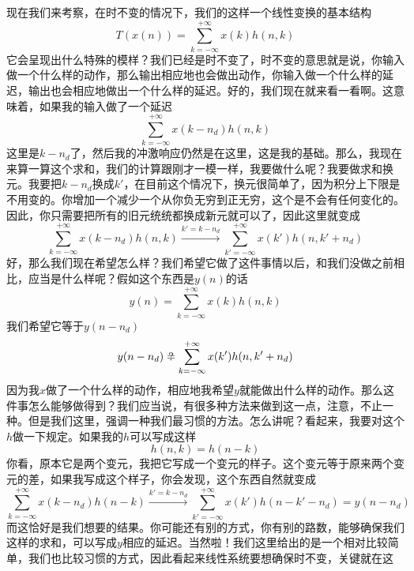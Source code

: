 \documentclass[a4paper,12pt]{article}
\begin{document}
现在我们来考察，在时不变的情况下，我们的这样一个线性变换的基本结构
\begin{equation}
   T\left ( x(n) \right ) = \sum_{k=-\infty}^{+\infty}x(k)h(n,k)
\end{equation}
它会呈现出什么特殊的模样？我们已经是时不变了，时不变的意思就是说，你输入做一个什么样的动作，那么输出相应地也会做出动作，你输入做一个什么样的延迟，输出也会相应地做出一个什么样的延迟。好的，我们现在就来看一看啊。这意味着，如果我的输入做了一个延迟
\begin{equation}
   \sum_{k=-\infty}^{+\infty}x(k-n_d)h(n,k)
\end{equation}
这里是$k-n_d$了，然后我的冲激响应仍然是在这里，这是我的基础。那么，我现在来算一算这个求和，我们的计算跟刚才一模一样，我要做什么呢？我要做求和换元。我要把$k-n_d$换成$k'$，在目前这个情况下，换元很简单了，因为积分上下限是不用变的。你增加一个减少一个从你负无穷到正无穷，这个是不会有任何变化的。因此，你只需要把所有的旧元统统都换成新元就可以了，因此这里就变成
\begin{equation}
  \sum_{k=-\infty}^{+\infty}x(k-n_d)h(n,k)  \xrightarrow{k'=k-n_d}
  \sum_{k'=-\infty}^{+\infty}x(k')h(n,k'+n_d)
\end{equation}
好，那么我们现在希望怎么样？我们希望它做了这件事情以后，和我们没做之前相比，应当是什么样呢？假如这个东西是$y(n)$的话
\begin{equation}
   y(n) = \sum_{k=-\infty}^{+\infty}x(k)h(n,k)
\end{equation}
我们希望它等于$y(n-n_d)$
\begin{equation}
  y(n-n_d) \mathrel{\ooalign{$=$\cr\hidewidth\raisebox{-0.1ex}{$?$}\hidewidth\cr}} \sum_{k=-\infty}^{+\infty}x(k')h(n,k'+n_d)
\end{equation}
因为我$x$做了一个什么样的动作，相应地我希望$y$就能做出什么样的动作。那么这件事怎么能够做得到？我们应当说，有很多种方法来做到这一点，注意，不止一种。但是我们这里，强调一种我们最习惯的方法。怎么讲呢？看起来，我要对这个$h$做一下规定。如果我的$h$可以写成这样
\begin{equation}
   h(n,k) = h(n-k)
\end{equation}
你看，原本它是两个变元，我把它写成一个变元的样子。这个变元等于原来两个变元的差，如果我写成这个样子，你会发现，这个东西自然就变成
\begin{equation}
  \sum_{k=-\infty}^{+\infty}x(k-n_d)h(n-k)  \xrightarrow{k'=k-n_d}
  \sum_{k'=-\infty}^{+\infty}x(k')h(n-k'-n_d) = y(n-n_d)
\end{equation}
而这恰好是我们想要的结果。你可能还有别的方式，你有别的路数，能够确保我们这样的求和，可以写成$y$相应的延迟。当然啦！我们这里给出的是一个相对比较简单，我们也比较习惯的方式，因此看起来线性系统要想确保时不变，关键就在这
\end{document}

